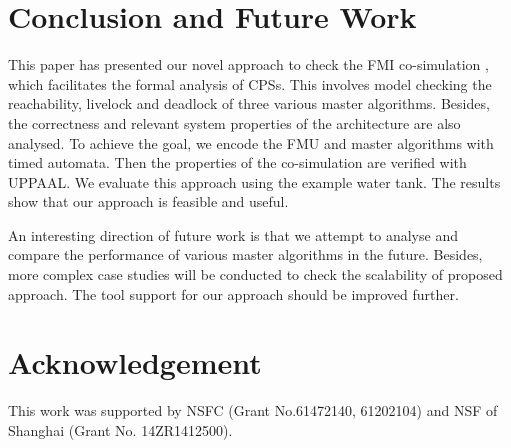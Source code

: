 \section{Conclusion and Future Work}
\label{sec:conclusion&ack}
This paper has presented our novel approach to check the FMI co-simulation , which facilitates the formal analysis of CPSs. This involves model checking the reachability, livelock and deadlock of three various master algorithms. Besides, the correctness and  relevant system properties of the architecture are also analysed. To achieve the goal, we encode the FMU and master algorithms with timed automata. Then the properties of the co-simulation are verified with UPPAAL. We evaluate this approach using the example water tank. The results show that our approach is feasible and useful.

An interesting direction of future work is that we attempt to analyse and compare the performance of various master algorithms in the future. Besides, more complex case studies will be conducted to check the scalability of proposed approach. The tool support for our approach should be improved further.
\section*{Acknowledgement}
This work was supported by NSFC (Grant No.61472140, 61202104) and NSF of Shanghai (Grant No. 14ZR1412500).



